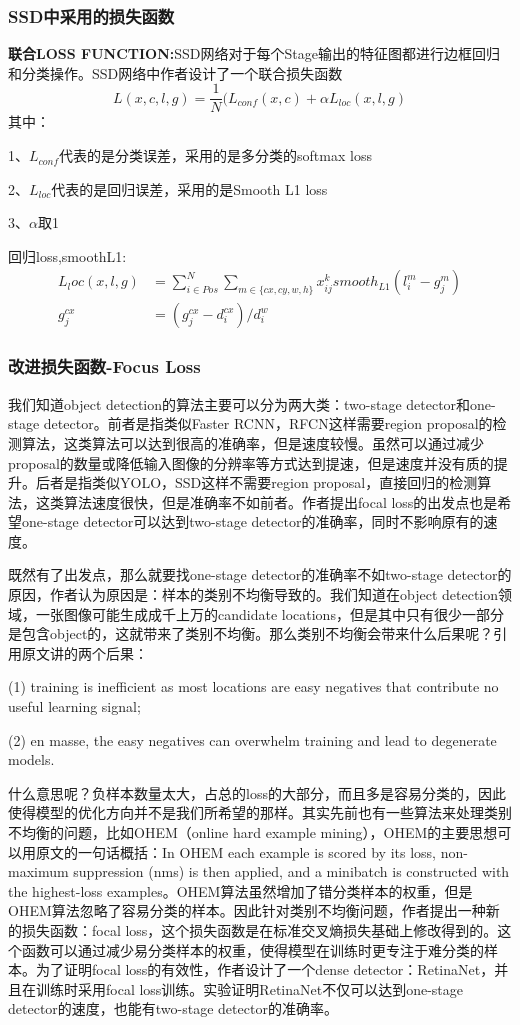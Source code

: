 \subsubsection{SSD中采用的损失函数}
\textbf{联合LOSS FUNCTION:}SSD网络对于每个Stage输出的特征图都进行边框回归和分类操作。SSD网络中作者设计了一个联合损失函数
\[
	L(x,c,l,g) = \frac{1}{N}(L_{conf}(x,c) + \alpha L_{loc}(x,l,g)
\]
其中：

 1、$L_{conf}$代表的是分类误差，采用的是多分类的softmax loss
 
 2、$L_{loc}$代表的是回归误差，采用的是Smooth L1 loss
 
 3、$\alpha$取1
 
 回归loss,smoothL1:
\begin{align*}
 L_loc(x,l,g) &= \sum _{i \in Pos} ^{N} \sum_{m \in \{cx,cy,w,h\}} x_{ij}^k smooth _{L1} (l_i ^m - g_j ^m) \\
 g_j^{cx} &= \left( g_j ^{cx} - d_i ^{cx} \right) / d_i ^w 
\end{align*}

\subsubsection{改进损失函数-Focus Loss}
我们知道object detection的算法主要可以分为两大类：two-stage detector和one-stage detector。前者是指类似Faster RCNN，RFCN这样需要region proposal的检测算法，这类算法可以达到很高的准确率，但是速度较慢。虽然可以通过减少proposal的数量或降低输入图像的分辨率等方式达到提速，但是速度并没有质的提升。后者是指类似YOLO，SSD这样不需要region proposal，直接回归的检测算法，这类算法速度很快，但是准确率不如前者。作者提出focal loss的出发点也是希望one-stage detector可以达到two-stage detector的准确率，同时不影响原有的速度。

既然有了出发点，那么就要找one-stage detector的准确率不如two-stage detector的原因，作者认为原因是：样本的类别不均衡导致的。我们知道在object detection领域，一张图像可能生成成千上万的candidate locations，但是其中只有很少一部分是包含object的，这就带来了类别不均衡。那么类别不均衡会带来什么后果呢？引用原文讲的两个后果：

(1) training is inefficient as most locations are easy negatives that contribute no useful learning signal; 

(2) en masse, the easy negatives can overwhelm training and lead to degenerate models. 

什么意思呢？负样本数量太大，占总的loss的大部分，而且多是容易分类的，因此使得模型的优化方向并不是我们所希望的那样。其实先前也有一些算法来处理类别不均衡的问题，比如OHEM（online hard example mining），OHEM的主要思想可以用原文的一句话概括：In OHEM each example is scored by its loss, non-maximum suppression (nms) is then applied, and a minibatch is constructed with the highest-loss examples。OHEM算法虽然增加了错分类样本的权重，但是OHEM算法忽略了容易分类的样本。因此针对类别不均衡问题，作者提出一种新的损失函数：focal loss，这个损失函数是在标准交叉熵损失基础上修改得到的。这个函数可以通过减少易分类样本的权重，使得模型在训练时更专注于难分类的样本。为了证明focal loss的有效性，作者设计了一个dense detector：RetinaNet，并且在训练时采用focal loss训练。实验证明RetinaNet不仅可以达到one-stage detector的速度，也能有two-stage detector的准确率。

